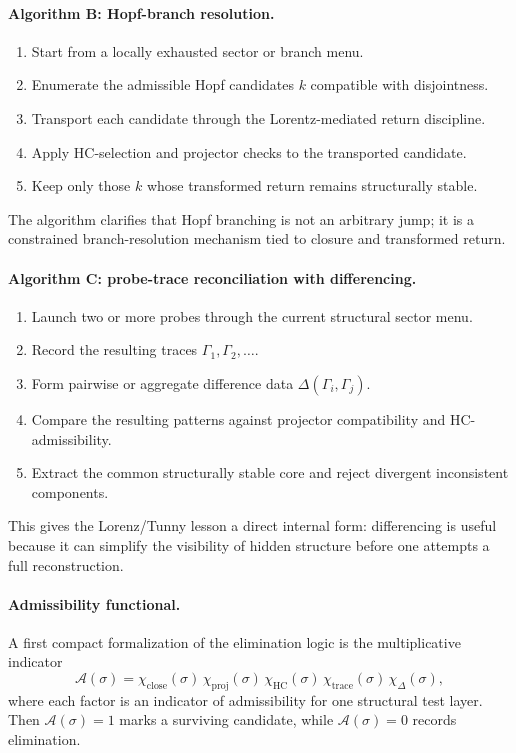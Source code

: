 \paragraph{Algorithm B: Hopf-branch resolution.}
\begin{enumerate}[leftmargin=2em,label=\arabic*.]
  \item Start from a locally exhausted sector or branch menu.
  \item Enumerate the admissible Hopf candidates $k$ compatible with disjointness.
  \item Transport each candidate through the Lorentz-mediated return discipline.
  \item Apply HC-selection and projector checks to the transported candidate.
  \item Keep only those $k$ whose transformed return remains structurally stable.
\end{enumerate}
The algorithm clarifies that Hopf branching is not an arbitrary jump; it is a constrained branch-resolution mechanism tied to closure and transformed return.

\paragraph{Algorithm C: probe-trace reconciliation with differencing.}
\begin{enumerate}[leftmargin=2em,label=\arabic*.]
  \item Launch two or more probes through the current structural sector menu.
  \item Record the resulting traces $\Gamma_1,\Gamma_2,\dots$.
  \item Form pairwise or aggregate difference data $\Delta(\Gamma_i,\Gamma_j)$.
  \item Compare the resulting patterns against projector compatibility and HC-admissibility.
  \item Extract the common structurally stable core and reject divergent inconsistent components.
\end{enumerate}
This gives the Lorenz/Tunny lesson a direct internal form: differencing is useful because it can simplify the visibility of hidden structure before one attempts a full reconstruction.

\paragraph{Admissibility functional.}
A first compact formalization of the elimination logic is the multiplicative indicator
\[
\mathcal A(\sigma)=\chi_{\mathrm{close}}(\sigma)\,\chi_{\mathrm{proj}}(\sigma)\,\chi_{\mathrm{HC}}(\sigma)\,\chi_{\mathrm{trace}}(\sigma)\,\chi_{\Delta}(\sigma),
\]
where each factor is an indicator of admissibility for one structural test layer. Then $\mathcal A(\sigma)=1$ marks a surviving candidate, while $\mathcal A(\sigma)=0$ records elimination.

